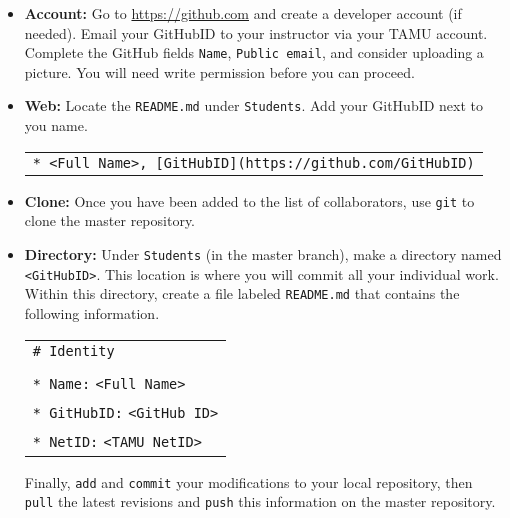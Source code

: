 \documentclass[11pt]{article}
\begin{document}
\begin{itemize}
\item \textbf{Account:} Go to \url{https://github.com} and create a developer account (if needed).
Email your GitHubID to your instructor via your TAMU account.
Complete the GitHub fields \texttt{Name}, \texttt{Public email}, and consider uploading a picture.
You will need write permission before you can proceed.
\item \textbf{Web:} Locate the \texttt{README.md} under \texttt{Students}.
Add your GitHubID next to you name.
\begin{center}
\begin{tabular}{l}
\texttt{* <Full Name>, [GitHubID](https://github.com/GitHubID)}
\end{tabular}
\end{center}
\item \textbf{Clone:} Once you have been added to the list of collaborators, use \texttt{git} to clone the master repository.
\item \textbf{Directory:} Under \texttt{Students} (in the master branch), make a directory named \texttt{<GitHubID>}.
This location is where you will commit all your individual work.
Within this directory, create a file labeled \texttt{README.md} that contains the following information.
\begin{center}
\begin{tabular}{l}
\texttt{\# Identity} \\
\\
\texttt{* Name:} \texttt{<Full Name>} \\
\texttt{* GitHubID:} \texttt{<GitHub ID>} \\
\texttt{* NetID:} \texttt{<TAMU NetID>}
\end{tabular}
\end{center}
Finally, \texttt{add} and \texttt{commit} your modifications to your local repository, then \texttt{pull} the latest revisions and \texttt{push} this information on the master repository.
\end{itemize}
\end{document}
